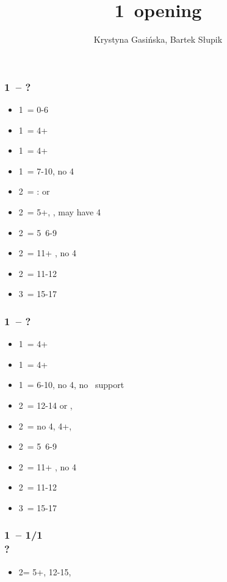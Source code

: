 \documentclass[12pt, a4paper]{article}
\title{1\mins\ opening}
\author{Krystyna Gasińska, Bartek Słupik}
\begin{document}
\maketitle


\subsubsection*{1\clubs\ -- ?}
\begin{itemize}
    \item 1\diams\ = 0-6
    \item 1\hearts\ = 4+\hearts
    \item 1\spades\ = 4+\spades
    \item 1\ntx\ = 7-10, no 4\majs
    \item 2\clubs\ = \gf: \bal or \clubs
    \item 2\diams\ = 5+\diams, \gf, may have 4\majs
    \item 2\hearts\ = 5\hearts\ 6-9
    \item 2\spades\ = 11+ \bal, no 4\majs
    \item 2\ntx\ = 11-12 \bal
    \item 3\nt\ = 15-17 \bal
\end{itemize}

\subsubsection*{1\diams\ -- ?}
\begin{itemize}
    \item 1\hearts\ = 4+\hearts
    \item 1\spades\ = 4+\spades
    \item 1\ntx\ = 6-10, no 4\majs, no \diams\ support
    \item 2\clubs\ = 12-14 \bal or \clubs, \gf
    \item 2\diams\ = no 4\majs, 4+\diams, \invp
    \item 2\hearts\ = 5\hearts\ 6-9
    \item 2\spades\ = 11+ \bal, no 4\majs
    \item 2\ntx\ = 11-12 \bal
    \item 3\nt\ = 15-17 \bal
\end{itemize}

\subsubsection*{1\clubs\ -- 1\hearts/1\spades \\ ?}
\begin{itemize}
    \item 2\clubs = 5+\clubs, 12-15, \unbal
\end{itemize}
\end{document}
